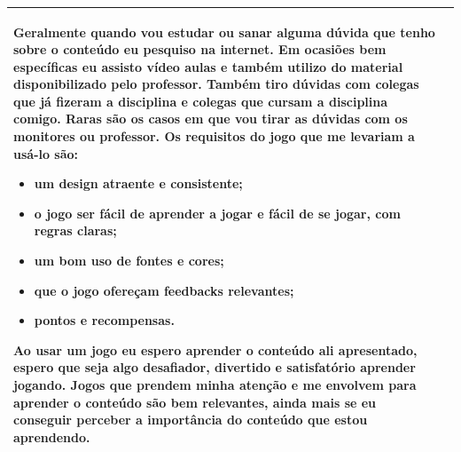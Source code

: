 \begin{table}[htbp]
\begin{tabular}{| m{} m{}|}
{        Geralmente quando vou estudar ou sanar alguma dúvida que tenho sobre o conteúdo eu pesquiso na internet. Em ocasiões bem específicas eu assisto vídeo aulas e também utilizo do material disponibilizado pelo professor. Também tiro dúvidas com colegas que já fizeram a disciplina e colegas que cursam a disciplina comigo. Raras são os casos em que vou tirar as dúvidas com os monitores ou professor. Os requisitos do jogo que me levariam a usá-lo são: 
        
        \begin{itemize}
            \item um design atraente e consistente; 
            \item o jogo ser fácil de aprender a jogar e fácil de se jogar, com regras claras; 
            \item um bom uso de fontes e cores; 
            \item que o jogo ofereçam feedbacks relevantes;
            \item pontos e recompensas.
        \end{itemize}
        
        Ao usar um jogo eu espero aprender o conteúdo ali apresentado, espero que seja algo desafiador, divertido e satisfatório aprender jogando. Jogos que prendem minha atenção e me envolvem para  aprender o conteúdo são bem relevantes, ainda mais se eu conseguir perceber a importância do conteúdo que estou aprendendo.
    
        
       } \\ \hline
\end{tabular}
\end{table}